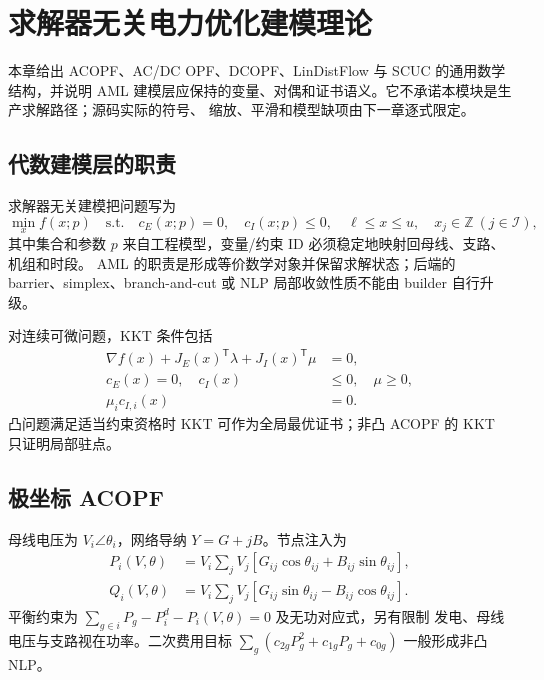 \section{求解器无关电力优化建模理论}\label{sec:power-models-theory}

\begin{theorynote}
本章给出 ACOPF、AC/DC OPF、DCOPF、LinDistFlow 与 SCUC 的通用数学结构，并说明 AML
建模层应保持的变量、对偶和证书语义。它不承诺本模块是生产求解路径；源码实际的符号、
缩放、平滑和模型缺项由下一章逐式限定。
\end{theorynote}

\subsection{代数建模层的职责}
求解器无关建模把问题写为
\begin{equation}
 \min_x f(x;p)\quad\text{s.t.}\quad c_E(x;p)=0,
 \quad c_I(x;p)\le0,
 \quad \ell\le x\le u,
 \quad x_j\in\mathbb Z\ (j\in\mathcal I),
\end{equation}
其中集合和参数 $p$ 来自工程模型，变量/约束 ID 必须稳定地映射回母线、支路、机组和时段。
AML 的职责是形成等价数学对象并保留求解状态；后端的 barrier、simplex、branch-and-cut 或
NLP 局部收敛性质不能由 builder 自行升级。

对连续可微问题，KKT 条件包括
\begin{align}
 \nabla f(x)+J_E(x)^\mathsf T\lambda+J_I(x)^\mathsf T\mu&=0,\\
 c_E(x)=0,\quad c_I(x)&\le0,\quad \mu\ge0,\\
 \mu_i c_{I,i}(x)&=0.
\end{align}
凸问题满足适当约束资格时 KKT 可作为全局最优证书；非凸 ACOPF 的 KKT 只证明局部驻点。

\subsection{极坐标 ACOPF}
母线电压为 $V_i\angle\theta_i$，网络导纳 $Y=G+jB$。节点注入为
\begin{align}
 P_i(V,\theta)&=V_i\sum_jV_j[G_{ij}\cos\theta_{ij}+B_{ij}\sin\theta_{ij}],\\
 Q_i(V,\theta)&=V_i\sum_jV_j[G_{ij}\sin\theta_{ij}-B_{ij}\cos\theta_{ij}].
\end{align}
平衡约束为 $\sum_{g\in i}P_g-P_i^d-P_i(V,\theta)=0$ 及无功对应式，另有限制
发电、母线电压与支路视在功率。二次费用目标
$\sum_g(c_{2g}P_g^2+c_{1g}P_g+c_{0g})$ 一般形成非凸 NLP。

